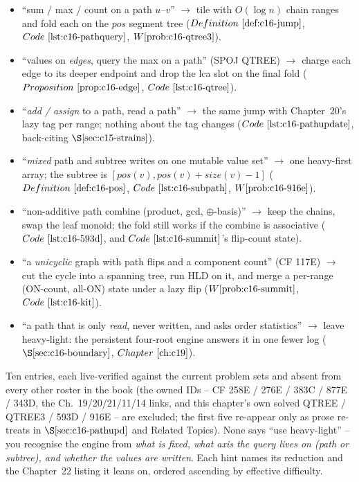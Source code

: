 \begin{itemize}[nosep, leftmargin=1.4em]
  \item ``sum / max / count on a path \(u\)--\(v\)'' \(\to\) tile with \(O(\log n)\) chain
        ranges and fold each on the \(\mathit{pos}\) segment tree
        (\(\defref{c16-jump}\), \(\coderef{c16-pathquery}\), \(\probref{c16-qtree3}\)).
  \item ``values on \emph{edges}, query the max on a path'' (SPOJ QTREE) \(\to\) charge each
        edge to its deeper endpoint and drop the lca slot on the final fold
        (\(\propref{c16-edge}\), \(\coderef{c16-qtree}\)).
  \item ``\emph{add / assign} to a path, read a path'' \(\to\) the same jump with Chapter~20's
        lazy tag per range; nothing about the tag changes (\(\coderef{c16-pathupdate}\),
        back-citing \(\secref{c15-strains}\)).
  \item ``\emph{mixed} path and subtree writes on one mutable value set'' \(\to\) one
        heavy-first array; the subtree is \([\mathit{pos}(v),\mathit{pos}(v)+\mathit{size}(v)-1]\)
        (\(\defref{c16-pos}\), \(\coderef{c16-subpath}\), \(\probref{c16-916e}\)).
  \item ``non-additive path combine (product, gcd, \(\oplus\)-basis)'' \(\to\) keep the chains,
        swap the leaf monoid; the fold still works if the combine is associative
        (\(\coderef{c16-593d}\), and \(\coderef{c16-summit}\)'s flip-count state).
  \item ``a \emph{unicyclic} graph with path flips and a component count'' (CF 117E) \(\to\)
        cut the cycle into a spanning tree, run HLD on it, and merge a per-range
        (ON-count, all-ON) state under a lazy flip (\(\probref{c16-summit}\),
        \(\coderef{c16-kit}\)).
  \item ``a path that is only \emph{read}, never written, and asks order statistics'' \(\to\)
        leave heavy-light: the persistent four-root engine answers it in one fewer log
        (\(\secref{c16-boundary}\), \(\chref{c19}\)).
\end{itemize}


Ten entries, each live-verified against the current problem sets and absent from every other
roster in the book (the owned IDs -- CF 258E / 276E / 383C / 877E / 343D, the Ch.~19/20/21/11/14
links, and this chapter's own solved QTREE / QTREE3 / 593D / 916E -- are excluded; the first five
re-appear only as prose re-treats in \(\secref{c16-pathupd}\) and Related Topics). None says
``use heavy-light'' -- you recognise the engine from \emph{what is fixed, what axis the query
lives on (path or subtree), and whether the values are written}. Each hint names its reduction
and the Chapter~22 listing it leans on, ordered ascending by effective difficulty.

